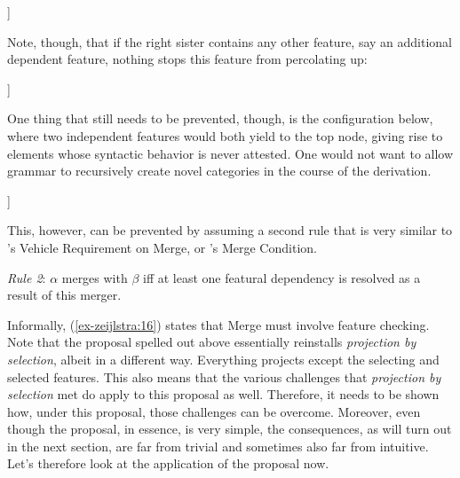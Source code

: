 \documentclass[output=paper
,modfonts
,nonflat]{langsci/langscibook}
\begin{document}
	\begin{exe}
		\ex\label{ex-zeijlstra:13}
		\begin{forest}	
			[\{{[}F{]}\}
			[\{{[}F{]}{,} {[}uG{]}\}]
			[\{{[}G{]}\}] ]
		\end{forest}
	\end{exe}
\noindent Note, though, that if the right sister contains any other feature, say an additional dependent feature, nothing stops this feature from percolating up:\largerpage

	\begin{exe}\ex
		\begin{forest}	
			[\{{[}F{]}{,} {[}uK{]}\}
			[\{{[}F{]}{,} {[}uG{]}\}]
			[\{{[}G{]}{,} {[}uK{]}\}] ]
		\end{forest}
	\end{exe}
\noindent One thing that still needs to be prevented, though, is the configuration below, where two independent features would both yield to the top node, giving rise to elements whose syntactic behavior is never attested. One would not want to allow grammar to recursively create novel categories in the course of the derivation.

	\begin{exe}
		\ex
		\begin{forest}	
			[*\{{[}F{]}{,} {[}G{]}\}
			[\{{[}F{]}\}]
			[\{{[}G{]}\}] ]
		\end{forest}
	\end{exe}
\noindent This, however, can be prevented by assuming a second rule that is very similar to \citet{Pesetsky_Torrego2006}'s Vehicle Requirement on Merge, or \citet{Wurmbrand2014}'s Merge Condition.

\begin{exe}
\ex \label{ex-zeijlstra:16} \textit{Rule 2}: $\alpha$ merges with $\beta$ iff at least one featural dependency is resolved as a result of this merger.
\end{exe}
Informally, (\ref{ex-zeijlstra:16}) states that Merge must involve feature checking. Note that the proposal spelled out above essentially reinstalls \textit{projection by selection}, albeit in a different way. Everything projects except the selecting and selected features. This also means that the various challenges that \textit{projection by selection} met do apply to this proposal as well. Therefore, it needs to be shown how, under this proposal, those challenges can be overcome. Moreover, even though the proposal, in essence, is very simple, the consequences, as will turn out in the next section, are far from trivial and sometimes also far from intuitive. Let’s therefore look at the application of the proposal now.
\end{document}
